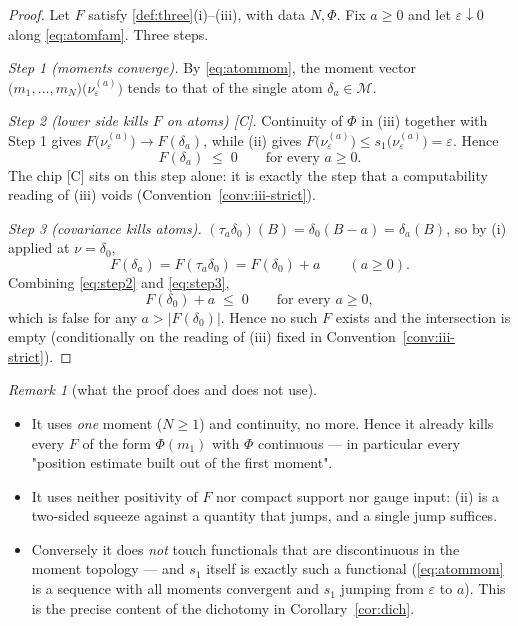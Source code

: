 \documentclass[11pt]{article}
\theoremstyle{definition}
\theoremstyle{remark}
\newtheorem{remark}[theorem]{Remark}
\newcommand{\grC}{\textsf{[C]}}
\begin{document}
\begin{proof}
Let $F$ satisfy \ref{def:three}(i)--(iii), with data $N,\Phi$. Fix $a\ge0$ and
let $\varepsilon\downarrow0$ along \eqref{eq:atomfam}. Three steps.

\smallskip
\noindent\emph{Step 1 (moments converge).} By \eqref{eq:atommom}, the moment
vector $\bigl(m_1,\dots,m_N\bigr)\bigl(\nu_\varepsilon^{(a)}\bigr)$ tends to
that of the single atom $\delta_a\in\mathcal M$.

\smallskip
\noindent\emph{Step 2 (lower side kills $F$ on atoms) \grC.} Continuity of
$\Phi$ in (iii) together with Step 1 gives
$F\bigl(\nu_\varepsilon^{(a)}\bigr)\to F(\delta_a)$, while (ii) gives
$F\bigl(\nu_\varepsilon^{(a)}\bigr)\le s_1\bigl(\nu_\varepsilon^{(a)}\bigr)=\varepsilon$.
Hence
\begin{equation}
F(\delta_a)\;\le\;0\qquad\text{for every }a\ge0 .
\label{eq:step2}
\end{equation}
The chip \grC{} sits on this step alone: it is exactly the step that a
computability reading of (iii) voids (Convention~\ref{conv:iii-strict}).

\smallskip
\noindent\emph{Step 3 (covariance kills atoms).} $(\tau_a\delta_0)(B)=\delta_0(B-a)=\delta_a(B)$,
so by (i) applied at $\nu=\delta_0$,
\begin{equation}
F(\delta_a)=F(\tau_a\delta_0)=F(\delta_0)+a \qquad(a\ge0).
\label{eq:step3}
\end{equation}
Combining \eqref{eq:step2} and \eqref{eq:step3},
\[
F(\delta_0)+a\;\le\;0\qquad\text{for every }a\ge0,
\]
which is false for any $a>|F(\delta_0)|$. Hence no such $F$ exists and the
intersection is empty (conditionally on the reading of (iii) fixed in
Convention~\ref{conv:iii-strict}).
\end{proof}

\begin{remark}[what the proof does and does not use]\label{rem:cheap}
\mbox{}
\begin{itemize}\itemsep1pt
\item It uses \emph{one} moment ($N\ge1$) and continuity, no more. Hence it
already kills every $F$ of the form $\Phi(m_1)$ with $\Phi$ continuous --- in
particular every "position estimate built out of the first moment".
\item It uses neither positivity of $F$ nor compact support nor gauge input:
(ii) is a two-sided squeeze against a quantity that jumps, and a single jump
suffices.
\item Conversely it does \emph{not} touch functionals that are discontinuous
in the moment topology --- and $s_1$ itself is exactly such a functional
(\eqref{eq:atommom} is a sequence with all moments convergent and
$s_1$ jumping from $\varepsilon$ to $a$). This is the precise content of the
dichotomy in Corollary~\ref{cor:dich}.
\end{itemize}
\end{remark}
\end{document}
